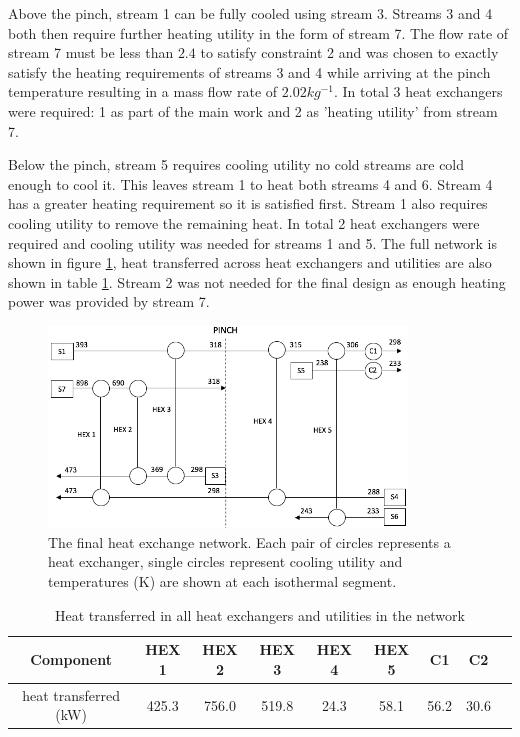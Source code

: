 \documentclass[11pt, oneside]{article}
\begin{document}
Above the pinch, stream 1 can be fully cooled using stream 3. Streams 3 and 4 both then require further heating utility in the form of stream 7. The flow rate of stream 7 must be less than $2.4$ to satisfy constraint 2 and was chosen to exactly satisfy the heating requirements of streams 3 and 4 while arriving at the pinch temperature resulting in a mass flow rate of $2.02 kg^{-1}$. In total 3 heat exchangers were required: 1 as part of the main work and 2 as 'heating utility' from stream 7. 

Below the pinch, stream 5 requires cooling utility no cold streams are cold enough to cool it. This leaves stream 1 to heat both streams 4 and 6. Stream 4 has a greater heating requirement so it is satisfied first. Stream 1 also requires cooling utility to remove the remaining heat. In total 2 heat exchangers were required and cooling utility was needed for streams 1 and 5. The full network is shown in figure \ref{fig:heatexnetwork}, heat transferred across heat exchangers and utilities are also shown in table \ref{tab:powerhex}. Stream 2 was not needed for the final design as enough heating power was provided by stream 7. 

\begin{figure} [h]
\centering
\includegraphics[width=0.85\textwidth]{./pictures/heatexnetworkBIG.png}
  \caption{The final heat exchange network. Each pair of circles represents a heat exchanger, single circles represent cooling utility and temperatures (K) are shown at each isothermal segment.} \label{fig:heatexnetwork}
  \end{figure}

\begin {table} [h]
\begin{center}
\caption{Heat transferred in all heat exchangers and utilities in the network} \label{tab:powerhex} 
\begin{tabular}{ |c|c|c|c|c|c|c|c|c| }
 \hline
  Component & HEX 1 & HEX 2 & HEX 3 & HEX 4 &HEX 5 & C1 & C2\\ 
 \hline
 heat transferred (kW) & 425.3 & 756.0 & 519.8 & 24.3 & 58.1 & 56.2 & 30.6\\ 
 \hline
\end{tabular}
\end{center}  
\end {table}
\end{document}
